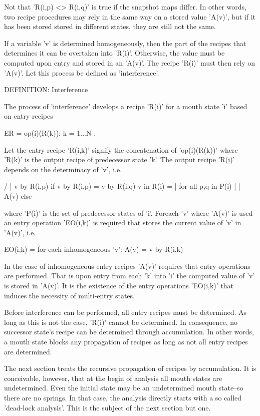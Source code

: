 \documentclass[12pt]{article}
\begin{document}
Not that 'R(i,p) <> R(i,q)' is true if the snapshot maps differ. In other
words, two recipe procedures may rely in the same way on a stored value 'A(v)',
but if it has been stored stored in different states, they are still not
the same.

If a variable 'v' is determined homogeneously, then the part of the recipes
that determines it can be overtaken into 'R(i)'. Otherwise, the value must be
computed upon entry and stored in an 'A(v)'. The recipe 'R(i)' must then rely
on 'A(v)'. Let this process be defined as 'interference'.

DEFINITION: Interference

    The process of 'interference' develops a recipe 'R(i)' for a mouth state
    'i' based on entry recipes 
    
                  ER = { op(i)(R(k)): k = 1...N }. 
                  
    Let the entry recipe 'R(i,k)' signify the concatenation of 'op(i)(R(k))'
    where 'R(k)' is the output recipe of predecessor state 'k'. The output
    recipe 'R(i)' depends on the determinacy of 'v', i.e. 

                     /
                     |  v by R(i,p)   if v by R(i,p) = v by R(i,q) 
         v in R(i) = |                for all p,q in P(i)
                     |
                     |  A(v)          else
                     \
    
    where 'P(i)' is the set of predecessor states of 'i'. Foreach 'v' where
    'A(v)' is used an entry operation 'EO(i,k)' is required that stores
    the current value of 'v' in 'A(v)', i.e.

         EO(i,k) = { for each inhomogeneous 'v': A(v) = v by R(i,k) }

In the case of inhomogeneous entry recipes 'A(v)' requires that entry
operations are performed.  That is upon entry from each 'k' into 'i' the
computed value of 'v' is stored in 'A(v)'.  It is the existence of the entry
operations 'EO(i,k)' that induces the necessity of multi-entry states.  

Before interference can be performed, all entry recipes must be determined.  As
long as this is not the case, 'R(i)' cannot be determined. In consequence, no
successor state's recipe can be determined through accumulation. In other
words,  a mouth state blocks any propagation of recipes as long as not all
entry recipes are determined. 

The next section treats the recursive propagation of recipes by accumulation.
It is conceivable, however, that at the begin of analysis all mouth states are
undetermined. Even the initial state may be an undetermined mouth state--so
there are no springs. In that case, the analysis directly starts with a so
called 'dead-lock analysis'. This is the subject of the next section but one.
\end{document}
